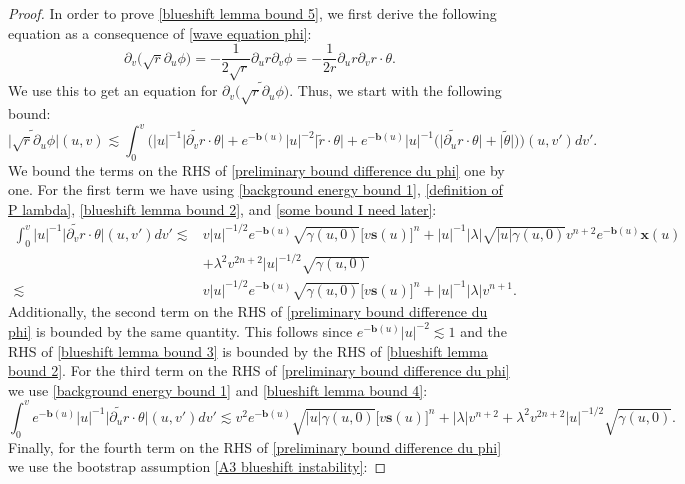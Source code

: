 \documentclass[10pt,a4paper]{amsart}
\begin{document}
\begin{proof}
    In order to prove \eqref{blueshift lemma bound 5}, we first derive the following equation as a consequence of \eqref{wave equation phi}:
    \[\partial_v\big(\sqrt{r}\partial_u\phi\big)=-\frac{1}{2\sqrt{r}}\partial_ur\partial_v\phi=-\frac{1}{2r}\partial_ur\partial_vr\cdot\theta.\]
    We use this to get an equation for $\partial_v\big(\widetilde{\sqrt{r}\partial_u\phi}\big)$. Thus, we start with the following bound:
    \begin{equation}\label{preliminary bound difference du phi}
        \big|\widetilde{\sqrt{r}\partial_u\phi}\big|(u,v)\lesssim\int_0^v\bigg(|u|^{-1}\big|\widetilde{\partial_vr}\cdot\theta\big|+e^{-\mathbf{b}(u)}|u|^{-2}\big|\widetilde{r}\cdot\theta\big|+e^{-\mathbf{b}(u)}|u|^{-1}\Big(\big|\widetilde{\partial_ur}\cdot\theta\big|+\big|\widetilde{\theta}\big|\Big)\bigg)(u,v')dv'.
    \end{equation}
    We bound the terms on the RHS of \eqref{preliminary bound difference du phi} one by one. For the first term we have using \eqref{background energy bound 1}, \eqref{definition of P lambda}, \eqref{blueshift lemma bound 2}, and \eqref{some bound I need later}:
    \begin{align*}
        \int_0^v|u|^{-1}\big|\widetilde{\partial_vr}\cdot\theta\big|(u,v')dv'\lesssim &v|u|^{-1/2}e^{-\mathbf{b}(u)}\sqrt{\gamma(u,0)}\big[v\mathbf{s}(u)\big]^{n}+|u|^{-1}|\lambda|\sqrt{|u|\gamma(u,0)}v^{n+2}e^{-\mathbf{b}(u)}\mathbf{x}(u)\\
        &+\lambda^2v^{2n+2}|u|^{-1/2}\sqrt{\gamma(u,0)}\\
        \lesssim &v|u|^{-1/2}e^{-\mathbf{b}(u)}\sqrt{\gamma(u,0)}\big[v\mathbf{s}(u)\big]^{n}+|u|^{-1}|\lambda|v^{n+1}.
    \end{align*}
    Additionally, the second term on the RHS of \eqref{preliminary bound difference du phi} is bounded by the same quantity. This follows since $e^{-\mathbf{b}(u)}|u|^{-2}\lesssim1$ and the RHS of \eqref{blueshift lemma bound 3} is bounded by the RHS of \eqref{blueshift lemma bound 2}. For the third term on the RHS of \eqref{preliminary bound difference du phi} we use \eqref{background energy bound 1} and \eqref{blueshift lemma bound 4}:
    \begin{equation*}
        \int_0^ve^{-\mathbf{b}(u)}|u|^{-1}\big|\widetilde{\partial_ur}\cdot\theta\big|(u,v')dv'\lesssim v^2e^{-\mathbf{b}(u)}\sqrt{|u|\gamma(u,0)}\big[v\mathbf{s}(u)\big]^{n}+|\lambda|v^{n+2}+\lambda^2v^{2n+2}|u|^{-1/2}\sqrt{\gamma(u,0)}.
    \end{equation*}
    Finally, for the fourth term on the RHS of \eqref{preliminary bound difference du phi} we use the bootstrap assumption \eqref{A3 blueshift instability}:

\end{proof}
\end{document}
